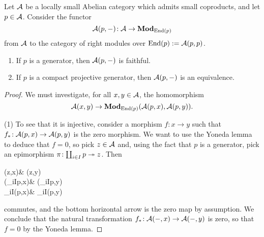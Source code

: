 \begin{theorem}\label{thm:abelian-cat-with-compact-projective-generator}
	Let \(\mathcal{A}\) be a locally small Abelian category which admits small coproducts, and let \(p\in\mathcal{A}\). Consider the functor
	\[ \mathcal{A}(p,-)\!:\mathcal{A}\to\mathbf{Mod}_{\operatorname{End}(p)} \]
	from \(\mathcal{A}\) to the category of right modules over \(\operatorname{End}(p) := \mathcal{A}(p,p)\).
	\begin{enumerate}[label=(\arabic*)]
	\item If \(p\) is a generator, then \(\mathcal{A}(p,-)\) is faithful.
	\item If \(p\) is a compact projective generator, then \(\mathcal{A}(p,-)\) is an equivalence.
	\end{enumerate}
\end{theorem}
\begin{proof}
We must investigate, for all \(x,y\in\mathcal{A}\), the homomorphism
\[ \mathcal{A}(x,y) \to \mathbf{Mod}_{\operatorname{End}(p)}(\mathcal{A}(p,x),\mathcal{A}(p,y)). \]

(1) To see that it is injective, consider a morphism \(f\!:x\to y\) such that \(f_*\!:\mathcal{A}(p,x)\to\mathcal{A}(p,y)\) is the zero morphism. We want
to use the Yoneda lemma to deduce that \(f=0\), so pick \(z\in\mathcal{A}\) and, using the fact that \(p\) is a generator, pick an epimorphism \(\pi\!:\coprod_{i\in I}p\twoheadrightarrow z\).
Then
\begin{diagram*}
	\calA(z,x)\ar[r,"f_*"]\ar[d,hook,"\pi^*"'] & \calA(z,y)\ar[d,hook,"\pi^*"'] \\
	\calA(\coprod_{i\in I}p,x)\ar[r,"f_*"] & \calA(\coprod_{i\in I}p,y) \\
	\prod_{i\in I}\calA(p,x)\ar[r,"(f_*)"] & \prod_{i\in I}\calA(p,y)
\end{diagram*}
commutes, and the bottom horizontal arrow is the zero map by assumption. We conclude that the natural transformation \(f_*\!:\mathcal{A}(-,x)\to\mathcal{A}(-,y)\) is zero,
so that \(f=0\) by the Yoneda lemma.


\end{proof}

